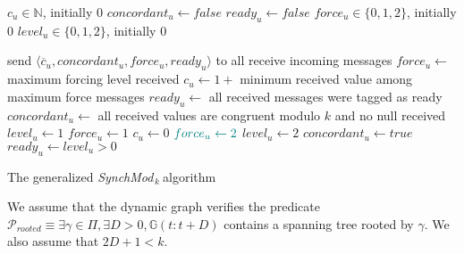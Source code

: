 \documentclass[11pt,letterpaper]{article}
\newcommand{\cent}{\gamma}
\newcommand{\SM}{{\em SynchMod}$_{\,k}\ $}
\begin{document}
\begin{algorithm}[htb]\label{algo:code}
\begin{distribalgo}[1]
\BLANK {}
	\STATE $c_u \in \mathds{N}$, initially 0
	\STATE $concordant_u \leftarrow false$
	\STATE $ready_u \leftarrow false$
	\STATE $force_u \in \{0, 1, 2\}$, initially 0
	\STATE $level_u \in \{0, 1, 2\}$, initially 0

\ENDINDENT \BLANK

	\STATE send $\langle \overline{c}_u, concordant_u, force_u, ready_u \rangle$ to all 
	\STATE receive incoming messages
	\STATE $force_u \leftarrow$ maximum forcing level received \label{line:force}
	\STATE $c_u \leftarrow 1+$ minimum received value among maximum force messages \label{line:min-z-end}
	\STATE $ready_u \leftarrow$ all received messages were tagged as ready \label{line:ready-gossip} 
	\STATE $concordant_u \leftarrow$ all received values are congruent modulo $k$ and no null received \label{line:conc-gossip}
	 \label{line:cond-levelup} 
			\STATE $level_u \leftarrow 1$
			\STATE $force_u \leftarrow 1$ \label{line:force2}
			\STATE $c_u \leftarrow 0$ \label{line:force3}
		\ENDIF
		 \label{line:cond-firing} 
			\STATE $\color{teal} force_u \leftarrow 2$
			\STATE $level_u \leftarrow 2$
		\ENDIF
		\STATE $concordant_u \leftarrow true$ \label{line:conc-true}
		\STATE $ready_u \leftarrow level_u > 0$ \label{line:init-ready}
	\ENDIF
\ENDINDENT 

\caption{The generalized \SM algorithm} \label{algo:R}
\end{distribalgo}

\end{algorithm}

We assume that the dynamic graph verifies the predicate $\mathcal{P}_{rooted} \equiv \exists \cent \in \Pi, \exists D > 0, \mathds{G}(t:t+D)$ contains a spanning tree rooted by $\cent$.
We also assume that $2D+1 < k$.
\end{document}

